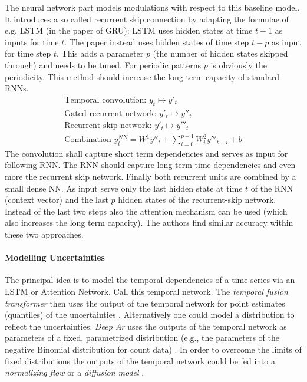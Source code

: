 \documentclass[12pt,a4paper]{article}
\begin{document}
The neural network part models modulations with respect to this baseline model. It introduces a so called recurrent skip connection by adapting the formulae of e.g. LSTM (in the paper of GRU): LSTM  uses hidden states at time $t-1$ as inputs for time $t$. The paper instead uses hidden states of time step $t-p$ as input for time step $t$. This adds a parameter $p$ (the number of hidden states skipped through) and needs to be tuned. For periodic patterns $p$ is obviously the periodicity. This method should increase the long term capacity of standard RNNs.
\begin{align}
 	\text{Temporal convolution: } y_t \mapsto y'_t \\
 	\text{Gated recurrent network: } y'_t \mapsto y''_t \\ 
	\text{Recurrent-skip network: } y'_t \mapsto y'''_t \\ 	
	\text{Combination } y_t^{NN} = W^1y''_t +  \sum_{i=0}^{p-1}W^2_iy'''_{t-i} + b   
\end{align}
The convolution shall capture short term dependencies and serves as input for following RNN. The RNN should capture long term time dependencies and even more the recurrent skip network.  Finally both recurrent units are combined by a small dense NN. As input serve only the last hidden state at time $t$ of the RNN (context vector) and the last $p$ hidden states of the recurrent-skip network. Instead of the last two steps also the attention mechanism can be used (which also increases the long term capacity). The authors find similar accuracy within these two approaches.


\paragraph{Modelling Uncertainties}
The principal idea is to model the temporal dependencies of a time series via an LSTM or Attention Network. Call this temporal network. The \textit{temporal fusion transformer} then uses the output of the temporal network for point estimates (quantiles) of the uncertainties \cite{google_2019_tft}.  
 Alternatively one could model a distribution to reflect the uncertainties. \textit{Deep Ar} uses the outputs of the temporal network as parameters of a fixed, parametrized distribution (e.g., the parameters of the negative Binomial distribution for count data) \cite{salinas_2017_deepar}. In order to overcome the limits of fixed distributions the outputs of the temporal network could be fed into a \textit{normalizing flow }\cite{zalando_2020_ts_flows} or a \textit{diffusion model} \cite{zalando_2020_ts_diffusion}. 
\end{document}
